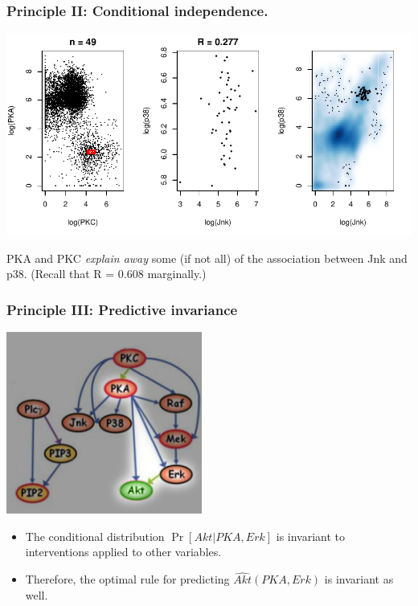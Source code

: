 \documentclass{beamer}
\begin{document}
\begin{frame}
\frametitle{Principle II: Conditional independence.}

\begin{center}
\includegraphics[scale = 0.7]{../images/plot03_04.pdf}
\end{center}

PKA and PKC \emph{explain away} some (if not all) of the association between Jnk and p38.
(Recall that R = 0.608 marginally.)

\end{frame}


\begin{frame}
\frametitle{Principle III: Predictive invariance}

\begin{center}
\includegraphics[scale = 0.5]{../images/fig04_01.png}
\end{center}


\begin{itemize}
\item The conditional distribution $\Pr[Akt|PKA, Erk]$ is invariant to interventions applied to other variables.
\item Therefore, the optimal rule for predicting $\hat{Akt}(PKA, Erk)$ is invariant as well.
\end{itemize}
\end{frame}
\end{document}
